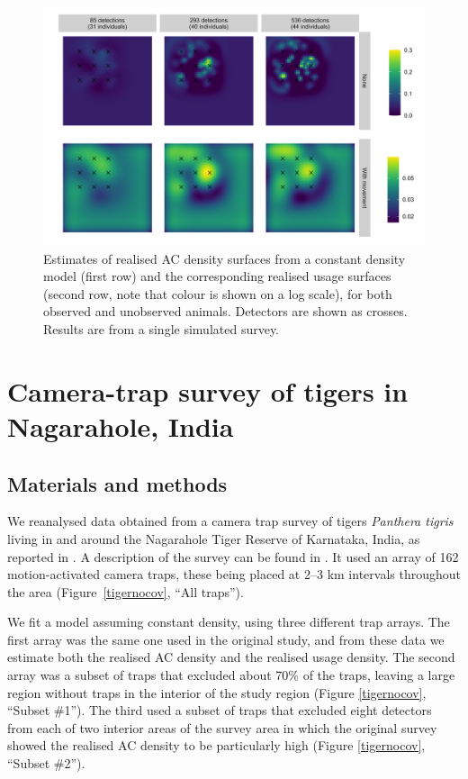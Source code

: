 \documentclass[10pt,a4paper]{article}
\begin{document}
\begin{figure}[htbp]
\centering
\includegraphics[width=1\textwidth]{mona_with_movement.png}
\caption{Estimates of realised AC density surfaces from a constant density model (first row) and the corresponding realised usage surfaces (second row, note that colour is shown on a log scale), for both observed and unobserved animals. Detectors are shown as crosses. Results are from a single simulated survey.}
\label{move}
\end{figure}

\section{Camera-trap survey of tigers in Nagarahole, India}

\subsection{Materials and methods}
We reanalysed data obtained from a camera trap survey of tigers {\it Panthera tigris} living in and around the Nagarahole Tiger Reserve of Karnataka, India, as reported in \cite{Dorazio+Karanth:17}. A description of the survey can be found in  \cite{Dorazio+Karanth:17}. It used an array of 162 motion-activated camera traps, these being placed at 2–3 km intervals throughout the area (Figure~\ref{tigernocov}, ``All traps''). 

We fit a model assuming constant density, using three different trap arrays. The first array was the same one used in the original study, and from these data we estimate both the realised AC density and the realised usage density. The second array was a subset of traps that excluded about 70\% of the traps, leaving a large region without traps in the interior of the study region (Figure \ref{tigernocov}, ``Subset \#1''). The third used a subset of traps that excluded eight detectors from each of two interior areas of the survey area in which the original survey showed the realised AC density to be 
particularly high (Figure \ref{tigernocov}, ``Subset \#2''). 
\end{document}
